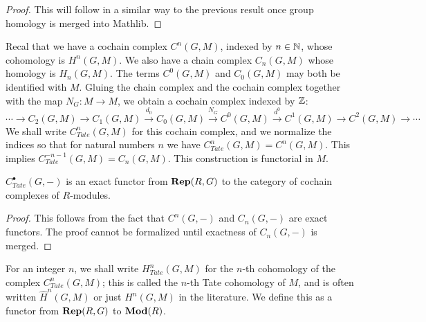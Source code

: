 \begin{proof}
	This will follow in a similar way to the previous result
	once group homology is merged into Mathlib.
\end{proof}

\begin{definition} \label{def:Tate complex}
	\leanok
	Recal that we have a cochain complex $C^n(G,M)$, indexed by $n \in {\mathbb N}$,
	 whose cohomology is $H^n(G,M)$.
	We also have a chain complex $C_n(G,M)$ whose homology is $H_n(G,M)$.
	The terms $C^0(G,M)$ and $C_0(G,M)$ may both be identified with $M$.
	Gluing the chain complex and the cochain complex together with the map $N_G : M \to M$, we obtain
	a cochain complex indexed by ${\mathbb Z}$:
	\[
		\cdots \to C_2(G,M) \to C_1(G,M) \stackrel{d_0}\to C_0(G,M)
		\stackrel{N_G}\to C^0(G,M) \stackrel{d^0}\to C^1(G,M) \to C^2(G,M) \to \cdots
	\]
	We shall write $C^n_{Tate}(G,M)$ for this cochain complex,
	and we normalize the indices so that for
	natural numbers $n$ we have $C^n_{Tate}(G,M) = C^n(G,M)$. This implies
	$C^{-n-1}_{Tate}(G,M) = C_n(G,M)$.
	This construction is functorial in $M$.
\end{definition}

\begin{lemma}	\label{lem:Tate complex exactness}
	\leanok
  $C^\bullet_{Tate}(G,-)$ is an exact functor from $\mathbf{Rep}(R,G)$ to the category
  of cochain complexes of $R$-modules.
\end{lemma}

\begin{proof}
	This follows from the fact that $C^n(G,-)$ and $C_n(G,-)$ are exact functors.
	The proof cannot be formalized until exactness of $C_n(G,-)$ is merged.
\end{proof}

\begin{definition} \label{def:Tate cohomology}
	For an integer $n$, we shall write $H^n_{Tate}(G,M)$ for the $n$-th cohomology of the complex
	$C^n_{Tate}(G,M)$; this is called the $n$-th Tate cohomology of $M$,
	and is often written $\hat H^n(G,M)$ or just $H^n(G,M)$ in the literature.
	We define this as a functor from $\mathbf{Rep}(R,G)$ to $\mathbf{Mod}(R)$.
\end{definition}

